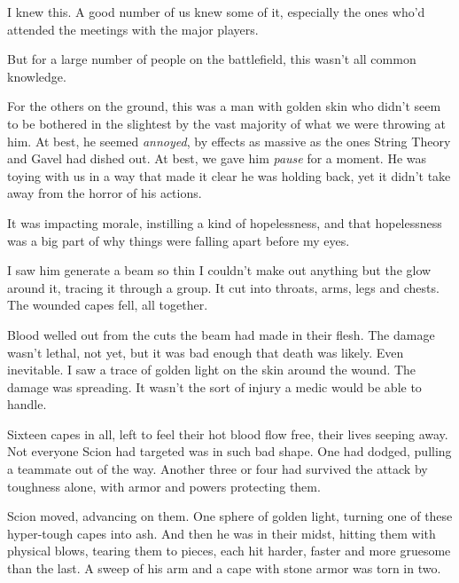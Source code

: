 I knew this.  A good number of us knew some of it, especially the ones who'd attended the meetings with the major players.



But for a large number of people on the battlefield, this wasn't all common knowledge.



For the others on the ground, this was a man with golden skin who didn't seem to be bothered in the slightest by the vast majority of what we were throwing at him.  At best, he seemed \emph{annoyed}, by effects as massive as the ones String Theory and Gavel had dished out.  At best, we gave him \emph{pause} for a moment.  He was toying with us in a way that made it clear he was holding back, yet it didn't take away from the horror of his actions.



It was impacting morale, instilling a kind of hopelessness, and that hopelessness was a big part of why things were falling apart before my eyes.



I saw him generate a beam so thin I couldn't make out anything but the glow around it, tracing it through a group.  It cut into throats, arms, legs and chests.  The wounded capes fell, all together.



Blood welled out from the cuts the beam had made in their flesh.  The damage wasn't lethal, not yet, but it was bad enough that death was likely.  Even inevitable.  I saw a trace of golden light on the skin around the wound.  The damage was spreading.  It wasn't the sort of injury a medic would be able to handle.



Sixteen capes in all, left to feel their hot blood flow free, their lives seeping away.  Not everyone Scion had targeted was in such bad shape.  One had dodged, pulling a teammate out of the way.  Another three or four had survived the attack by toughness alone, with armor and powers protecting them.



Scion moved, advancing on them.  One sphere of golden light, turning one of these hyper-tough capes into ash.  And then he was in their midst, hitting them with physical blows, tearing them to pieces, each hit harder, faster and more gruesome than the last.  A sweep of his arm and a cape with stone armor was torn in two.




